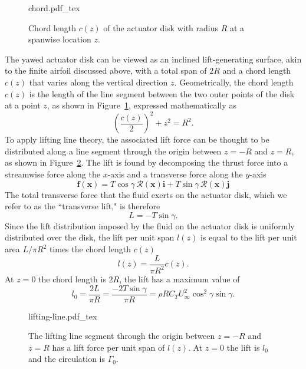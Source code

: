 \begin{figure}[b]
\begin{center}
{chord.pdf_tex}
\caption{\label{fig:chord} Chord length $c(z)$ of the actuator disk with radius $R$ at a spanwise location $z$. }
\end{center}
\end{figure}
%
The yawed actuator disk can be viewed as an inclined lift-generating surface, akin to the finite airfoil discussed above, with a total span of $2R$ and a chord length $c(z)$ that varies along the vertical direction $z$. Geometrically, the chord length $c(z)$ is the length of the line segment between the two outer points of the disk at a point $z$, as shown in Figure~\ref{fig:chord}, expressed mathematically as 
\begin{equation}
\label{eq:chord}
\left(\frac{c(z)}{2}\right)^2 + z^2 = R^2.
\end{equation}
To apply lifting line theory, the associated lift force can be thought to be distributed along a line segment through the origin between $z=-R$ and $z=R$, as shown in Figure~\ref{fig:lifting-line}.
The lift is found by decomposing the thrust force into a streamwise force along the $x$-axis and a transverse force along the $y$-axis
\begin{equation}
\boldsymbol f (\mathbf{x}) = T \cos \gamma \, \mathcal{R}(\mathbf{x}) \boldsymbol{i} + T \sin \gamma \, \mathcal{R}(\mathbf{x}) \boldsymbol{j} 
\end{equation}
The total transverse force that the fluid exerts on the actuator disk, which we refer to as the ``transverse lift," is therefore
\begin{equation}
L = - T \sin \gamma.
\end{equation}
Since the lift distribution imposed by the fluid on the actuator disk is uniformly distributed over the disk, the lift per unit span $l(z)$ is equal to the lift per unit area $L/\pi R^2$ times the chord length $c(z)$
\begin{equation}
l(z) = \frac{L}{\pi R^2} c(z).
\end{equation}
At $z=0$ the chord length is $2R$, the lift has a maximum value of 
\begin{equation}
\label{eq:l0}
l_0 = \frac{2L}{\pi R} = \frac{-2T\sin\gamma}{\pi R} =   \rho R  C_T U_\infty^2 \cos^2 \gamma \sin \gamma.
\end{equation}

\begin{figure}
\begin{center}
{lifting-line.pdf_tex}
\caption{\label{fig:lifting-line} The lifting line segment through the origin between $z=-R$ and $z=R$ has a lift force per unit span of $l(z)$. At $z=0$ the lift is $l_0$ and the circulation is $\Gamma_0$.}%
\end{center}
\end{figure}

